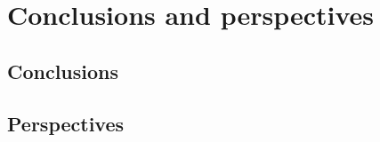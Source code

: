 \chapter{Conclusions and perspectives}
\label{Chapter5}
\section{Conclusions}

\section{Perspectives}